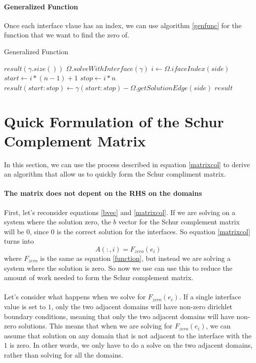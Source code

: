 \documentclass[12pt]{article}
\begin{document}
\paragraph{Generalized Function} 
Once each interface vlaue has an index, we can use algorithm \ref{genfunc} for the function that we
want to find the zero of.
\begin{algorithm}[H]
\caption{Generalized Function}
\begin{algorithmic}[1]
    \State $result(\gamma.size())$ 
        \State $\Omega.solveWithInterface(\gamma)$
                \State $i \gets \Omega.ifaceIndex(side)$
                \State $start \gets i*(n-1)+1$
                \State $stop \gets i*n$
                \State $result(start:stop) \gets \gamma(start:stop) - \Omega.getSolutionEdge(side)$
            \EndIf
        \EndFor
    \EndFor
    \State \Return $result$
    \EndProcedure
\end{algorithmic}
\label{genfunc}
\end{algorithm}

\section{Quick Formulation of the Schur Complement Matrix}
In this section, we can use the process described in equation \eqref{matrixcol} to derive an algorithm
that allow us to quickly form the Schur compliment matrix.
\paragraph{The matrix does not depent on the RHS on the domains}
First, let's reconsider equations  \eqref{bvec} and \eqref{matrixcol}. If we are solving on a system
where the solution zero, the $b$ vector for the Schur complement matrix will
be $0$, since $0$ is the correct solution for the interfaces. So equation \eqref{matrixcol} turns into
\begin{equation}
    A(:,i) = F_{zero}(e_i)
\end{equation}
where $F_{zero}$ is the same as equation \ref{function}, but instead we are solving a system where
the solution is zero.
So now we use can use this to reduce the amount of work needed to form the Schur complement matrix.
\\
\\
Let's consider what happens when we solve for $F_{zero}(e_i)$. If a single interface value is set
to $1$, only the two adjacent domains will have non-zero dirichlet boundary conditions, meaning that
only the two adjacent domains will have non-zero solutions. This means that when we are solving for 
$F_{zero}(e_i)$, we can  assume that solution on any domain that is not adjacent to the interface
with the $1$ is zero. In other words, we only have to do a solve on the two adjacent domains, rather
than solving for all the domains.
\end{document}
